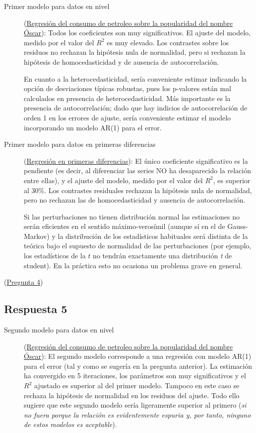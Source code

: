 \documentclass[10pt]{article}
\begin{document}
\begin{description}
\item[{Primer modelo para datos en nivel}] (\hyperref[sec:org6422a11]{Regresión del consumo de petroleo sobre la popularidad del nombre Óscar}): Todos los
coeficientes son muy significativos. El ajuste del modelo, medido
por el valor del \(R^2\) es muy elevado. Los contrastes sobre los
residuos no rechazan la hipótesis nula de normalidad, pero si
rechazan la hipótesis de homocedasticidad y de ausencia de
autocorrelación.

En cuanto a la heterocedasticidad, sería conveniente estimar
indicando la opción de desviaciones típicas robustas, pues los
p-valores están mal calculados en presencia de
heterocedasticidad. Más importante es la presencia de
autocorrelación; dado que hay indicios de autocorrelación de orden 1
en los errores de ajuste, sería conveniente estimar el modelo
incorporando un modelo AR(1) para el error.

\item[{Primer modelo para datos en primeras diferencias}] (\hyperref[sec:org346e39c]{Regresión en primeras diferencias}): El único coeficiente significativo es la
pendiente (es decir, al diferenciar las series NO ha desaparecido la
relación entre ellas), y el ajuste del modelo, medido por el valor
del \(R^2\), es superior al 30\%. Los contrastes residuales rechazan
la hipótesis nula de normalidad, pero no rechazan las de
homocedasticidad y ausencia de autocorrelación.

Si las perturbaciones no tienen distribución normal las estimaciones
no serán eficientes en el sentido máximo-verosímil (aunque sí en el
de Gauss-Markov) y la distribución de los estadísticos habituales
será distinta de la teórica bajo el supuesto de normalidad de las
perturbaciones (por ejemplo, los estadísticos de la \(t\) no tendrán
exactamente una distribución \emph{t} de student). En la práctica esto no
ocasiona un problema grave en general.
\end{description}

(\hyperref[sec:org70282e9]{Pregunta 4})
\subsection*{Respuesta 5}
\label{sec:org6103920}


\begin{description}
\item[{Segundo modelo para datos en nivel}] (\hyperref[sec:org6422a11]{Regresión del consumo de petroleo sobre la popularidad del nombre Óscar}): El segundo modelo
corresponde a una regresión con modelo AR(1) para el error (tal y
como se sugería en la pregunta anterior). La estimación ha
convergido en 5 iteraciones, los parámetros son muy significativos y
el \(R^2\) ajustado es superior al del primer modelo. Tampoco en este
caso se rechaza la hipótesis de normalidad en los residuos del
ajuste. Todo ello sugiere que este segundo modelo sería ligeramente
superior al primero (\emph{si no fuera porque la relación es
evidentemente espuria y, por tanto, ninguno de estos modelos es
aceptable}).
\end{description}
\end{document}
